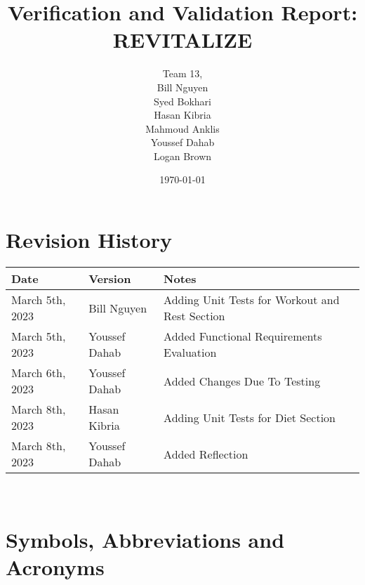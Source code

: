 \documentclass[12pt, titlepage]{article}
\begin{document}
\title{Verification and Validation Report: REVITALIZE} 
\author{Team 13, 
\\ Bill Nguyen
\\ Syed Bokhari
\\ Hasan Kibria
\\ Mahmoud Anklis
\\ Youssef Dahab
\\ Logan Brown}
\date{\today}

\maketitle


\section{Revision History}

\begin{tabularx}{\textwidth}{p{3cm}p{2cm}X}
\toprule {\bf Date} & {\bf Version} & {\bf Notes}\\
\midrule
March 5th, 2023 & Bill Nguyen & Adding Unit Tests for Workout and Rest Section\\
March 5th, 2023 & Youssef Dahab & Added Functional Requirements Evaluation\\
March 6th, 2023 & Youssef Dahab & Added Changes Due To Testing\\
March 8th, 2023 & Hasan Kibria & Adding Unit Tests for Diet Section\\
March 8th, 2023 & Youssef Dahab & Added Reflection\\
\bottomrule
\end{tabularx}

~\newpage

\section{Symbols, Abbreviations and Acronyms}
\end{document}
